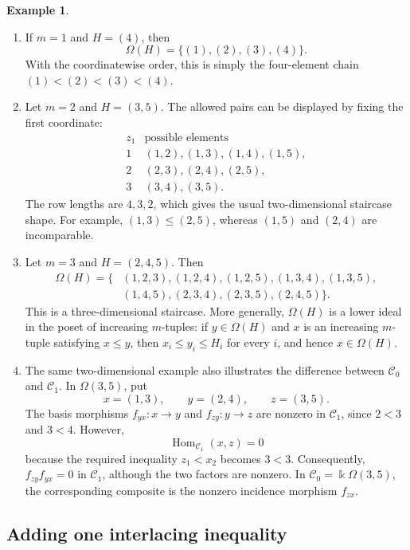\documentclass[12pt,a4paper,english,reqno]{amsart}
\theoremstyle{plain}
\theoremstyle{definition}
\newtheorem{exm}[theorem]{Example}
\newcommand{\kk}{\Bbbk}
\newcommand{\Hom}{\operatorname{Hom}}
\newcommand{\C}{\mathcal C}
\begin{document}
\begin{exm}
    

\begin{enumerate}
\item If $m=1$ and $H=(4)$, then
\[
 \Omega(H)=\{(1),(2),(3),(4)\}.
\]
With the coordinatewise order, this is simply the four-element chain
$(1)<(2)<(3)<(4)$.

\item Let $m=2$ and $H=(3,5)$.  The allowed pairs can be displayed by fixing
the first coordinate:
\[
\begin{array}{c|l}
 z_1&\text{possible elements}\\
 \hline
 1&(1,2),(1,3),(1,4),(1,5),\\
 2&(2,3),(2,4),(2,5),\\
 3&(3,4),(3,5).
\end{array}
\]
The row lengths are $4,3,2$, which gives the usual two-dimensional
staircase shape.  For example, $(1,3)\leq(2,5)$, whereas $(1,5)$ and
$(2,4)$ are incomparable.

\item Let $m=3$ and $H=(2,4,5)$.  Then
\[
\begin{aligned}
 \Omega(H)=\{& (1,2,3),(1,2,4),(1,2,5),
 (1,3,4),(1,3,5),\\
 & (1,4,5),(2,3,4),(2,3,5),(2,4,5)\}.
\end{aligned}
\]
This is a three-dimensional staircase.  More generally, $\Omega(H)$ is a
lower ideal in the poset of increasing $m$-tuples: if $y\in\Omega(H)$ and
$x$ is an increasing $m$-tuple satisfying $x\leq y$, then
$x_i\leq y_i\leq H_i$ for every $i$, and hence $x\in\Omega(H)$.

\item The same two-dimensional example also illustrates the difference
between $\C_0$ and $\C_1$.  In $\Omega(3,5)$, put
\[
 x=(1,3),\qquad y=(2,4),\qquad z=(3,5).
\]
The basis morphisms $f_{yx}\colon x\to y$ and
$f_{zy}\colon y\to z$ are nonzero in $\C_1$, since
$2<3$ and $3<4$.  However,
\[
 \Hom_{\C_1}(x,z)=0
\]
because the required inequality $z_1<x_2$ becomes $3<3$.
Consequently, $f_{zy}f_{yx}=0$ in $\C_1$, although the two factors are
nonzero.  In $\C_0=\kk\Omega(3,5)$, the corresponding composite is the
nonzero incidence morphism $f_{zx}$.
\end{enumerate}
\end{exm}





\subsection{Adding one interlacing inequality}
\end{document}
